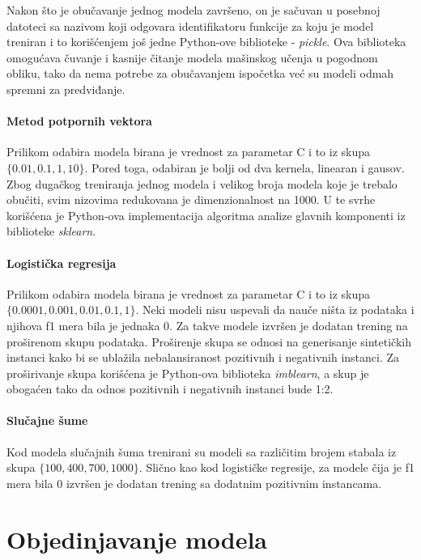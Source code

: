 Nakon što je obučavanje jednog modela završeno, on je sačuvan u posebnoj datoteci sa nazivom koji odgovara identifikatoru funkcije za koju je model treniran i to korišćenjem još jedne Python-ove biblioteke - \textit{pickle}. Ova biblioteka omogućava čuvanje i kasnije čitanje modela mašinskog učenja u pogodnom obliku, tako da nema potrebe za obučavanjem ispočetka već su modeli odmah spremni za predviđanje.


\paragraph{Metod potpornih vektora}

Prilikom odabira modela birana je vrednost za parametar C i to iz skupa $\{0.01, 0.1, 1, 10\}$. Pored toga, odabiran je bolji od dva kernela, linearan i gausov. Zbog dugačkog treniranja jednog modela i velikog broja modela koje je trebalo obučiti, svim nizovima redukovana je dimenzionalnost na 1000. U te svrhe korišćena je Python-ova implementacija algoritma analize glavnih komponenti iz biblioteke \textit{sklearn}.  



\paragraph{Logistička regresija}

Prilikom odabira modela birana je vrednost za parametar C i to iz skupa $\{0.0001, 0.001, 0.01, 0.1, 1\}$. Neki modeli nisu uspevali da nauče ništa iz podataka i njihova f1 mera bila je jednaka 0. Za takve modele izvršen je dodatan trening na proširenom skupu podataka. Proširenje skupa se odnosi na generisanje sintetičkih instanci kako bi se ublažila nebalansiranost pozitivnih i negativnih instanci. Za proširivanje skupa korišćena je Python-ova biblioteka \textit{imblearn}, a skup je obogaćen tako da odnos pozitivnih i negativnih instanci bude 1:2.


\paragraph{Slučajne šume}

Kod modela slučajnih šuma trenirani su modeli sa različitim brojem stabala iz skupa $\{100, 400, 700, 1000\}$. Slično kao kod logističke regresije, za modele čija je f1 mera bila 0 izvršen je dodatan trening sa dodatnim pozitivnim instancama.



\section{Objedinjavanje modela}

